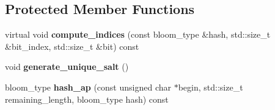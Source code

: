 \subsection*{Protected Member Functions}
\begin{DoxyCompactItemize}
\item 
\hypertarget{classstrtk_1_1bloom_1_1filter_a10bdf2999e326607ec004fa855fbcc36}{virtual void {\bfseries compute\-\_\-indices} (const bloom\-\_\-type \&hash, std\-::size\-\_\-t \&bit\-\_\-index, std\-::size\-\_\-t \&bit) const }\label{classstrtk_1_1bloom_1_1filter_a10bdf2999e326607ec004fa855fbcc36}

\item 
\hypertarget{classstrtk_1_1bloom_1_1filter_ae0f781b16fd20e5ce5453cafae1a8ae9}{void {\bfseries generate\-\_\-unique\-\_\-salt} ()}\label{classstrtk_1_1bloom_1_1filter_ae0f781b16fd20e5ce5453cafae1a8ae9}

\item 
\hypertarget{classstrtk_1_1bloom_1_1filter_a22f76cc997cf2eb97741261fff575354}{bloom\-\_\-type {\bfseries hash\-\_\-ap} (const unsigned char $\ast$begin, std\-::size\-\_\-t remaining\-\_\-length, bloom\-\_\-type hash) const }\label{classstrtk_1_1bloom_1_1filter_a22f76cc997cf2eb97741261fff575354}

\end{DoxyCompactItemize}
